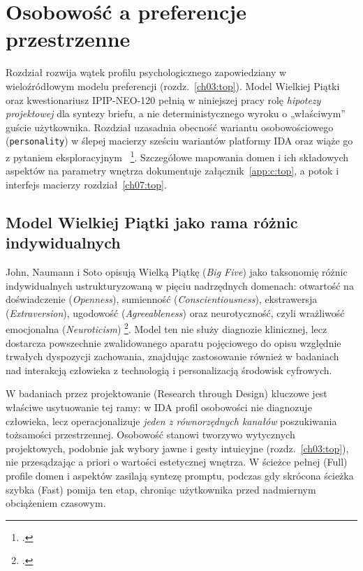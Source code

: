 \chapter{Osobowość a preferencje przestrzenne}
\label{ch05:top}

Rozdział rozwija wątek profilu psychologicznego zapowiedziany w wieloźródłowym modelu preferencji (rozdz.~\ref{ch03:top}). Model Wielkiej Piątki oraz kwestionariusz IPIP-NEO-120 pełnią w niniejszej pracy rolę \emph{hipotezy projektowej} dla syntezy briefu, a nie deterministycznego wyroku o „właściwym” guście użytkownika.
Rozdział uzasadnia obecność wariantu osobowościowego (\texttt{personality}) w ślepej macierzy sześciu wariantów platformy IDA oraz wiąże go z pytaniem eksploracyjnym~ \footcite{idaPlatform2026}.
Szczegółowe mapowania domen i ich składowych aspektów na parametry wnętrza dokumentuje załącznik~\ref{app:c:top}, a potok i interfejs macierzy rozdział~\ref{ch07:top}.

\section{Model Wielkiej Piątki jako rama różnic indywidualnych}
\label{ch05:sec:bigfive}

John, Naumann i Soto opisują Wielką Piątkę (\emph{Big Five}) jako taksonomię różnic indywidualnych ustrukturyzowaną w pięciu nadrzędnych domenach: otwartość na doświadczenie (\emph{Openness}), sumienność (\emph{Conscientiousness}), ekstrawersja (\emph{Extraversion}), ugodowość (\emph{Agreeableness}) oraz neurotyczność, czyli wrażliwość emocjonalna (\emph{Neuroticism}) \footcite{john2008bigfive}.
Model ten nie służy diagnozie klinicznej, lecz dostarcza powszechnie zwalidowanego aparatu pojęciowego do opisu względnie trwałych dyspozycji zachowania, znajdując zastosowanie również w badaniach nad interakcją człowieka z technologią i personalizacją środowisk cyfrowych.

W badaniach przez projektowanie (Research through Design) kluczowe jest właściwe usytuowanie tej ramy: w IDA profil osobowości nie diagnozuje człowieka, lecz operacjonalizuje \emph{jeden z równorzędnych kanałów} poszukiwania tożsamości przestrzennej.
Osobowość stanowi tworzywo wytycznych projektowych, podobnie jak wybory jawne i gesty intuicyjne (rozdz.~\ref{ch03:top}), nie przesądzając a priori o wartości estetycznej wnętrza.
W ścieżce pełnej (Full) profile domen i aspektów zasilają syntezę promptu, podczas gdy skrócona ścieżka szybka (Fast) pomija ten etap, chroniąc użytkownika przed nadmiernym obciążeniem czasowym.

